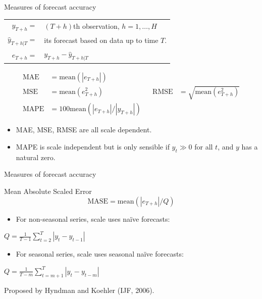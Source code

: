 \documentclass[
  14pt,
  ignorenonframetext,
  aspectratio=169,
]{beamer}
\providecommand{\tightlist}{%
  \setlength{\itemsep}{0pt}\setlength{\parskip}{0pt}}
\def\pred#1#2#3{\hat{#1}_{#2|#3}}
\begin{document}
\begin{frame}{Measures of forecast accuracy}
\protect{}\label{measures-of-forecast-accuracy-2}
\begin{tabular}{rl}
$y_{T+h}=$ & $(T+h)$th observation, $h=1,\dots,H$ \\
$\pred{y}{T+h}{T}=$ & its forecast based on data up to time $T$. \\
$e_{T+h} =$  & $y_{T+h} - \pred{y}{T+h}{T}$
\end{tabular}

\begin{block}{}\vspace*{-0.7cm}
\begin{align*}
\text{MAE} &= \text{mean}(|e_{T+h}|) \\[-0.2cm]
\text{MSE} &= \text{mean}(e_{T+h}^2) \qquad
&&\text{RMSE} &= \sqrt{\text{mean}(e_{T+h}^2)} \\[-0.1cm]
\text{MAPE} &= 100\text{mean}(|e_{T+h}|/ |y_{T+h}|)
\end{align*}\vspace*{-0.9cm}
\end{block}
\pause

\begin{itemize}
\tightlist
\item
  MAE, MSE, RMSE are all scale dependent.
\item
  MAPE is scale independent but is only sensible if \(y_t\gg 0\) for all
  \(t\), and \(y\) has a natural zero.
\end{itemize}
\end{frame}

\begin{frame}{Measures of forecast accuracy}
\protect{}\label{measures-of-forecast-accuracy-3}
\fontsize{13}{15}\sf

\begin{block}{Mean Absolute Scaled Error}
$$
  \text{MASE} = \text{mean}(|e_{T+h}|/Q)
$$
\end{block} \pause

\begin{itemize}
\tightlist
\item
  For non-seasonal series, scale uses naïve forecasts:
\end{itemize}

\centerline{$Q = \frac{1}{T-1}\displaystyle\sum_{t=2}^T |y_{t}-y_{t-1}|$}

\begin{itemize}
\tightlist
\item
  For seasonal series, scale uses seasonal naïve forecasts:
\end{itemize}

\centerline{$Q = \frac{1}{T-m}\displaystyle\sum_{t=m+1}^T |y_{t}-y_{t-m}|$}
\pause

Proposed by Hyndman and Koehler (IJF, 2006).
\end{frame}
\end{document}
